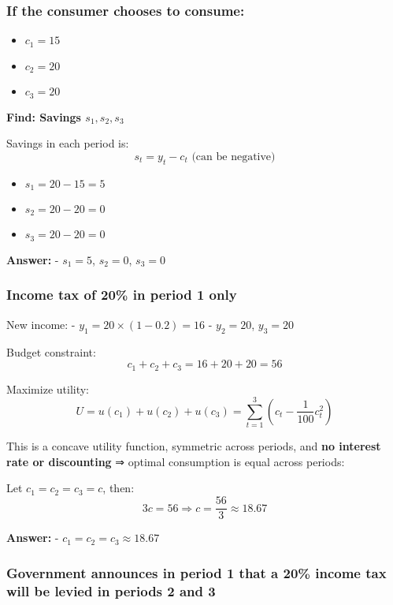 \documentclass[
]{article}
\providecommand{\tightlist}{%
  \setlength{\itemsep}{0pt}\setlength{\parskip}{0pt}}
\begin{document}
\subsubsection{If the consumer chooses to
consume:}\label{if-the-consumer-chooses-to-consume}

\begin{itemize}
\tightlist
\item
  \(c_1 = 15\)
\item
  \(c_2 = 20\)
\item
  \(c_3 = 20\)
\end{itemize}

\textbf{Find: Savings \(s_1, s_2, s_3\)}

Savings in each period is: \[
s_t = y_t - c_t \text{ (can be negative)}
\]

\begin{itemize}
\tightlist
\item
  \(s_1 = 20 - 15 = 5\)
\item
  \(s_2 = 20 - 20 = 0\)
\item
  \(s_3 = 20 - 20 = 0\)
\end{itemize}

\textbf{Answer:} - \(s_1 = 5\), \(s_2 = 0\), \(s_3 = 0\)

\subsubsection{Income tax of 20\% in period 1
only}\label{income-tax-of-20-in-period-1-only}

New income: - \(y_1 = 20 \times (1 - 0.2) = 16\) - \(y_2 = 20\),
\(y_3 = 20\)

Budget constraint: \[
c_1 + c_2 + c_3 = 16 + 20 + 20 = 56
\]

Maximize utility: \[
U = u(c_1) + u(c_2) + u(c_3) = \sum_{t=1}^3 \left(c_t - \frac{1}{100}c_t^2\right)
\]

This is a concave utility function, symmetric across periods, and
\textbf{no interest rate or discounting} ⇒ optimal consumption is equal
across periods:

Let \(c_1 = c_2 = c_3 = c\), then: \[
3c = 56 \Rightarrow c = \frac{56}{3} \approx 18.67
\]

\textbf{Answer:} - \(c_1 = c_2 = c_3 \approx 18.67\)

\subsubsection{Government announces in period 1 that a 20\% income tax
will be levied in periods 2 and
3}\label{government-announces-in-period-1-that-a-20-income-tax-will-be-levied-in-periods-2-and-3}
\end{document}
